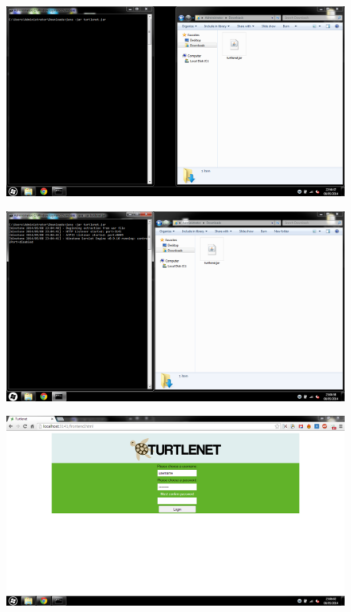 \begin{centering}
\begin{figure}[p] \includegraphics[scale=0.4]{images/screenshots/1startprogram.png} \end{figure}
\begin{figure}[p] \includegraphics[scale=0.4]{images/screenshots/2running.png} \end{figure}
\begin{figure}[p] \includegraphics[scale=0.5]{images/screenshots/4login.png} \end{figure}

\end{centering}
